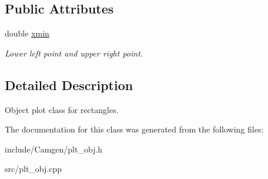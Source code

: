 \subsection*{Public Attributes}
\begin{DoxyCompactItemize}
\item 
\hypertarget{a00430_a0072bf141020155ae4d9ecafb9c4864e}{}double \hyperlink{a00430_a0072bf141020155ae4d9ecafb9c4864e}{xmin}\label{a00430_a0072bf141020155ae4d9ecafb9c4864e}

\begin{DoxyCompactList}\small\item\em Lower left point and upper right point. \end{DoxyCompactList}\end{DoxyCompactItemize}


\subsection{Detailed Description}
Object plot class for rectangles. 

The documentation for this class was generated from the following files\+:\begin{DoxyCompactItemize}
\item 
include/\+Camgen/plt\+\_\+obj.\+h\item 
src/plt\+\_\+obj.\+cpp\end{DoxyCompactItemize}
